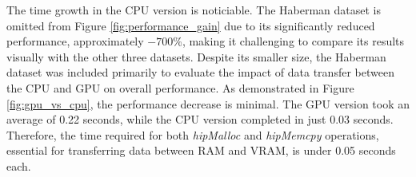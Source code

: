 The time growth in the CPU version is noticiable.
The Haberman dataset is omitted from Figure \ref{fig:performance_gain} due to its significantly reduced performance, approximately $-700\%$, making it challenging to compare its results visually with the other three datasets. Despite its smaller size, the Haberman dataset was included primarily to evaluate the impact of data transfer between the CPU and GPU on overall performance. As demonstrated in Figure \ref{fig:gpu_vs_cpu}, the performance decrease is minimal. The GPU version took an average of 0.22 seconds, while the CPU version completed in just 0.03 seconds. Therefore, the time required for both \emph{hipMalloc} and \emph{hipMemcpy} operations, essential for transferring data between RAM and VRAM, is under 0.05 seconds each.
